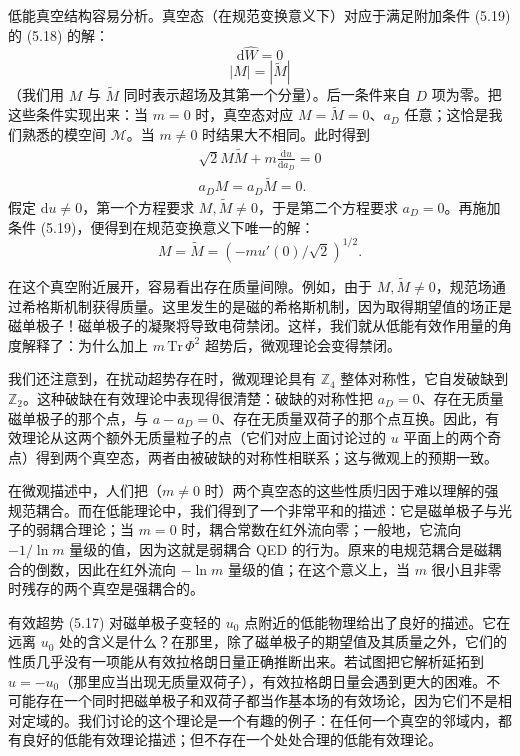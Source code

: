 \documentclass[11pt,a4paper,UTF8,fontset=fandol]{ctexart}
\theoremstyle{plain}
\theoremstyle{definition}
\begin{document}
低能真空结构容易分析。真空态（在规范变换意义下）对应于满足附加条件 (5.19) 的 (5.18) 的解：
\begin{equation}
    \mathrm{d}\widehat W = 0 \tag{5.18}
\end{equation}
\begin{equation}
    |M| = |\widetilde M| \tag{5.19}
\end{equation}
（我们用 $M$ 与 $\widetilde M$ 同时表示超场及其第一个分量）。后一条件来自 $D$ 项为零。把这些条件实现出来：当 $m=0$ 时，真空态对应 $M=\widetilde M=0$、$a_D$ 任意；这恰是我们熟悉的模空间 $\mathcal M$。当 $m\neq 0$ 时结果大不相同。此时得到
\begin{equation}
\begin{gathered}
    \sqrt{2}M\widetilde M + m\frac{\mathrm{d}u}{\mathrm{d}a_D} = 0\\
    a_D M = a_D\widetilde M = 0.
\end{gathered}
\tag{5.20}
\end{equation}
假定 $\mathrm{d}u\neq 0$，第一个方程要求 $M,\widetilde M\neq 0$，于是第二个方程要求 $a_D=0$。再施加条件 (5.19)，便得到在规范变换意义下唯一的解：
\begin{equation}
    M = \widetilde M = \left(-m u'(0)/\sqrt{2}\right)^{1/2}. \tag{5.21}
\end{equation}

在这个真空附近展开，容易看出存在质量间隙。例如，由于 $M,\widetilde M\neq 0$，规范场通过希格斯机制获得质量。这里发生的是磁的希格斯机制，因为取得期望值的场正是磁单极子！磁单极子的凝聚将导致电荷禁闭。这样，我们就从低能有效作用量的角度解释了：为什么加上 $m\,\mathrm{Tr}\,\Phi^2$ 超势后，微观理论会变得禁闭。

我们还注意到，在扰动超势存在时，微观理论具有 $\mathbb Z_4$ 整体对称性，它自发破缺到 $\mathbb Z_2$。这种破缺在有效理论中表现得很清楚：破缺的对称性把 $a_D=0$、存在无质量磁单极子的那个点，与 $a-a_D=0$、存在无质量双荷子的那个点互换。因此，有效理论从这两个额外无质量粒子的点（它们对应上面讨论过的 $u$ 平面上的两个奇点）得到两个真空态，两者由被破缺的对称性相联系；这与微观上的预期一致。

在微观描述中，人们把（$m\neq 0$ 时）两个真空态的这些性质归因于难以理解的强规范耦合。而在低能理论中，我们得到了一个非常平和的描述：它是磁单极子与光子的弱耦合理论；当 $m=0$ 时，耦合常数在红外流向零；一般地，它流向 $-1/\ln m$ 量级的值，因为这就是弱耦合 QED 的行为。原来的电规范耦合是磁耦合的倒数，因此在红外流向 $-\ln m$ 量级的值；在这个意义上，当 $m$ 很小且非零时残存的两个真空是强耦合的。

有效超势 (5.17) 对磁单极子变轻的 $u_0$ 点附近的低能物理给出了良好的描述。它在远离 $u_0$ 处的含义是什么？在那里，除了磁单极子的期望值及其质量之外，它们的性质几乎没有一项能从有效拉格朗日量正确推断出来。若试图把它解析延拓到 $u=-u_0$（那里应当出现无质量双荷子），有效拉格朗日量会遇到更大的困难。不可能存在一个同时把磁单极子和双荷子都当作基本场的有效场论，因为它们不是相对定域的。我们讨论的这个理论是一个有趣的例子：在任何一个真空的邻域内，都有良好的低能有效理论描述；但不存在一个处处合理的低能有效理论。
\end{document}

